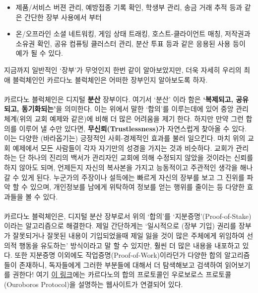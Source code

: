 \documentclass[a4paper, 11pt]{article}
\begin{document}
\begin{description}
        \begin{itemize}
            \item 제품/서비스 버젼 관리, 예방접종 기록 확인, 학생부 관리, 송금 거래 추적 등과 같은 간단한 장부 사용에서 부터
            \item 온/오프라인 소셜 네트워킹, 게임 상태 트래킹, 호스트-클라이언트 매칭, 저작권과 소유권 확인, 공유 컴퓨팅 클러스터 관리, 분산 투표 등과 같은 응용된 사용 등이 예가 될 수 있다.
        \end{itemize}

        지금까지 일반적인 `장부'가 무엇인지 한번 같이 알아보았지만, 더욱 자세히 우리의 최애 블럭체인인 카르다노 블럭체인은 어떠한 장부인지 알아보도록 하자.

        \paragraph{}카르다노 블럭체인은 디지털 \textbf{분산} 장부이다. 여기서 `분산' 이라 함은 \textbf{`복제되고, 공유되고, 동기화되는'}을 의미한다. 이는 위에서 말한 `합의'를 이루는데에 있어 중앙 관리 체계(위의 교회 예제와 같은)에 비해 더 많은 어려움을 제기 한다. 하지만 만약 그런 합의를 이루어 낼 수만 있다면, \textbf{무신뢰(Trustlessness)}가 자연스럽게 찾아올 수 있다. 이는 다양한 (바라옵기는) 긍정적인 사회-경제적인 효과를 불러 일으킨다. 마치 위의 교회 예제에서 모든 사람들이 각자 자기만의 성경을 가지는 것과 비슷하다. 교회가 관리하는 단 하나의 진리의 백서가 관리자인 교회에 의해 수정되지 않았을 것이라는 신뢰를 하지 않아도 되며, 언제든지 자신의 복사본을 가지고 능동적이고 주관적인 생각을 해나갈 수 있게 된다. 누군가의 주장이나 설득에는 빠르게 자신의 장부를 보고 그 진위를 파악 할 수 있으며, 개인정보를 남에게 위탁하여 정보를 얻는 행위를 줄이는 등 다양한 효과들을 볼 수 있다.

        \paragraph{} 카르다노 블럭체인은, 디지털 분산 장부로서 위의 `합의'를 `지분증명'(Proof-of-Stake)이라는 알고리즘으로 해결한다. 제일 간단하게는 `일시적으로 (장부 기입) 권리를 장부가 잘못되거나 잘못된 내용이 기입되었을때 제일 잃을 것이 많은 주체에게 위임하여 선의적 행동을 유도하는' 방식이라고 말 할 수 있지만, 훨씬 더 많은 내용을 내포하고 있다. 또한 지분증명 이외에도 작업증명(Proof-of-Work)이라던가 다양한 합의 알고리즘들이 존재하니, 독자들에게 그러한 부분들에 대해서 더 탐색해보고 검색하여 읽어보기를 권한다! 여기 \href{https://cardano.org/ouroboros/}{이 링크}에는 카르다노의 합의 프로토콜인 우로보로스 프로토콜(Ouroboros Protocol)을 설명하는 웹사이트가 연결되어 있다.


\end{description}
\end{document}
